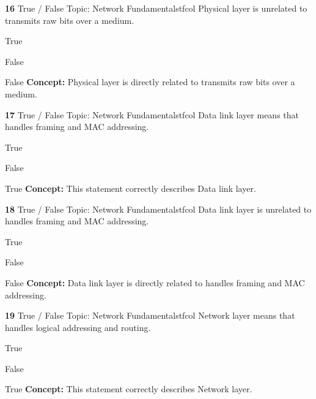 \documentclass[10pt,a4paper]{article}
\begin{document}
\begin{qcard}{\color{white}\textbf{16} \hfill \small True / False \textbar{} Topic: Network Fundamentals}{tfcol}
Physical layer is unrelated to transmits raw bits over a medium.

\begin{qoptions}
\item True
\item False
\end{qoptions}
\begin{explainbox}{False}
\textbf{Concept:} Physical layer is directly related to transmits raw bits over a medium.
\end{explainbox}
\end{qcard}

\begin{qcard}{\color{white}\textbf{17} \hfill \small True / False \textbar{} Topic: Network Fundamentals}{tfcol}
Data link layer means that handles framing and MAC addressing.

\begin{qoptions}
\item True
\item False
\end{qoptions}
\begin{explainbox}{True}
\textbf{Concept:} This statement correctly describes Data link layer.
\end{explainbox}
\end{qcard}

\begin{qcard}{\color{white}\textbf{18} \hfill \small True / False \textbar{} Topic: Network Fundamentals}{tfcol}
Data link layer is unrelated to handles framing and MAC addressing.

\begin{qoptions}
\item True
\item False
\end{qoptions}
\begin{explainbox}{False}
\textbf{Concept:} Data link layer is directly related to handles framing and MAC addressing.
\end{explainbox}
\end{qcard}

\begin{qcard}{\color{white}\textbf{19} \hfill \small True / False \textbar{} Topic: Network Fundamentals}{tfcol}
Network layer means that handles logical addressing and routing.

\begin{qoptions}
\item True
\item False
\end{qoptions}
\begin{explainbox}{True}
\textbf{Concept:} This statement correctly describes Network layer.
\end{explainbox}
\end{qcard}
\end{document}
